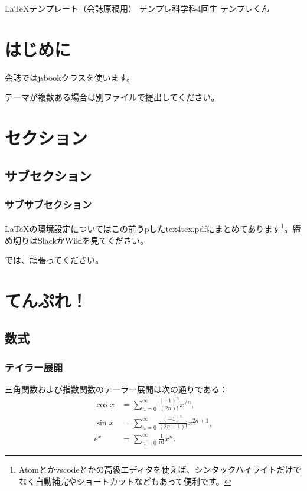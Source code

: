 \documentclass[10pt,b5paper,papersize,dvipdfmx]{jsbook}
\begin{document}

\kaishititle%
  {\LaTeX テンプレート（会誌原稿用）}%
  {テンプレ科学科4回生}%
  {テンプレくん}%


%
\section*{はじめに}
会誌ではjsbookクラスを使います。\par
テーマが複数ある場合は別ファイルで提出してください。

%
\section{セクション}
\subsection{サブセクション}
\subsubsection{サブサブセクション}
LaTeXの環境設定についてはこの前うpしたtex4tex.pdfにまとめてあります\footnote{Atomとかvscodeとかの高級エディタを使えば、シンタックハイライトだけでなく自動補完やショートカットなどもあって便利です。}。締め切りはSlackかWikiを見てください。\par
では、頑張ってください。

%
\section{てんぷれ！}

%
\subsection{数式}

%
\subsubsection{テイラー展開}
三角関数および指数関数のテーラー展開は次の通りである：
\begin{align}
    \cos x &= \sum_{n=0}^\infty \frac{(-1)^n}{(2n)!} x^{2n}, \label{eq:cos}\\
    \sin x &= \sum_{n=0}^\infty \frac{(-1)^n}{(2n+1)!} x^{2n+1}, \label{eq:sin}\\
    e^x &= \sum_{n=0}^\infty \frac{1}{n!} x^n. \label{eq:exp}
\end{align}
\end{document}
